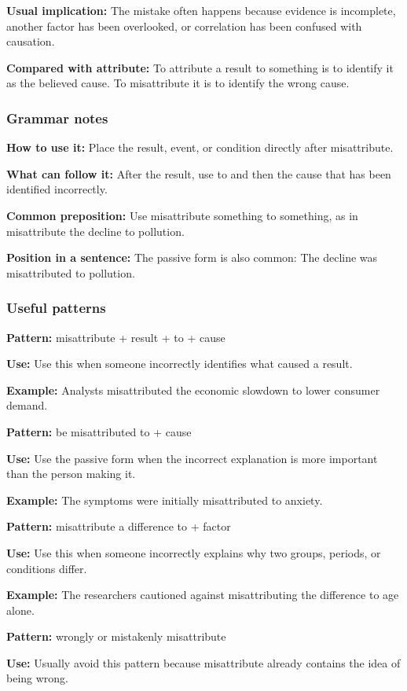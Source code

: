 \documentclass[11pt]{article}
\begin{document}
\textbf{Usual implication:} The mistake often happens because evidence is incomplete, another factor has been overlooked, or correlation has been confused with causation.

\textbf{Compared with attribute:} To attribute a result to something is to identify it as the believed cause. To misattribute it is to identify the wrong cause.

\subsubsection{Grammar notes}
\textbf{How to use it:} Place the result, event, or condition directly after misattribute.

\textbf{What can follow it:} After the result, use to and then the cause that has been identified incorrectly.

\textbf{Common preposition:} Use misattribute something to something, as in misattribute the decline to pollution.

\textbf{Position in a sentence:} The passive form is also common: The decline was misattributed to pollution.

\subsubsection{Useful patterns}
\textbf{Pattern:} misattribute + result + to + cause

\textbf{Use:} Use this when someone incorrectly identifies what caused a result.

\textbf{Example:} Analysts misattributed the economic slowdown to lower consumer demand.

\textbf{Pattern:} be misattributed to + cause

\textbf{Use:} Use the passive form when the incorrect explanation is more important than the person making it.

\textbf{Example:} The symptoms were initially misattributed to anxiety.

\textbf{Pattern:} misattribute a difference to + factor

\textbf{Use:} Use this when someone incorrectly explains why two groups, periods, or conditions differ.

\textbf{Example:} The researchers cautioned against misattributing the difference to age alone.

\textbf{Pattern:} wrongly or mistakenly misattribute

\textbf{Use:} Usually avoid this pattern because misattribute already contains the idea of being wrong.
\end{document}
